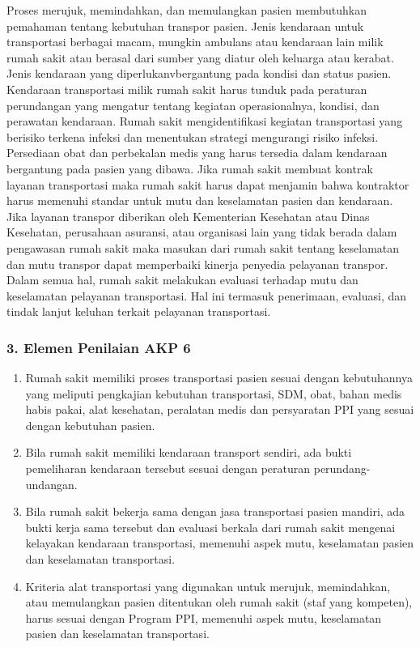 \documentclass[
]{book}
\providecommand{\tightlist}{%
  \setlength{\itemsep}{0pt}\setlength{\parskip}{0pt}}
\begin{document}
Proses merujuk, memindahkan, dan memulangkan pasien membutuhkan pemahaman tentang kebutuhan transpor pasien. Jenis kendaraan untuk transportasi berbagai macam, mungkin ambulans atau kendaraan lain milik rumah sakit atau berasal dari sumber yang diatur oleh keluarga atau kerabat. Jenis kendaraan yang diperlukanvbergantung pada kondisi dan status pasien. Kendaraan transportasi milik rumah sakit harus tunduk pada peraturan perundangan yang mengatur tentang kegiatan operasionalnya, kondisi, dan perawatan kendaraan. Rumah sakit mengidentifikasi kegiatan transportasi yang berisiko terkena infeksi dan menentukan strategi mengurangi risiko infeksi. Persediaan obat dan perbekalan medis yang harus tersedia dalam kendaraan bergantung pada pasien yang dibawa. Jika rumah sakit membuat kontrak layanan transportasi maka rumah sakit harus dapat menjamin bahwa kontraktor harus memenuhi standar untuk mutu dan keselamatan pasien dan kendaraan. Jika layanan transpor diberikan oleh Kementerian Kesehatan atau Dinas Kesehatan, perusahaan asuransi, atau
organisasi lain yang tidak berada dalam pengawasan rumah sakit maka masukan dari rumah sakit tentang keselamatan dan mutu transpor dapat memperbaiki kinerja penyedia pelayanan transpor. Dalam semua hal, rumah sakit melakukan evaluasi terhadap mutu dan keselamatan pelayanan transportasi. Hal ini termasuk penerimaan, evaluasi, dan tindak lanjut keluhan terkait pelayanan transportasi.

\hypertarget{elemen-penilaian-akp-6}{%
\subsubsection*{3. Elemen Penilaian AKP 6}\label{elemen-penilaian-akp-6}}

\begin{enumerate}
\def\labelenumi{\alph{enumi}.}
\tightlist
\item
  Rumah sakit memiliki proses transportasi pasien sesuai dengan kebutuhannya yang meliputi pengkajian kebutuhan transportasi, SDM, obat, bahan medis habis pakai, alat kesehatan, peralatan medis dan persyaratan PPI yang sesuai dengan kebutuhan pasien.
\item
  Bila rumah sakit memiliki kendaraan transport sendiri, ada bukti pemeliharan kendaraan tersebut sesuai dengan peraturan perundang-undangan.
\item
  Bila rumah sakit bekerja sama dengan jasa transportasi pasien mandiri, ada bukti kerja sama tersebut dan evaluasi berkala dari rumah sakit mengenai kelayakan kendaraan transportasi, memenuhi aspek mutu, keselamatan pasien dan keselamatan transportasi.
\item
  Kriteria alat transportasi yang digunakan untuk merujuk, memindahkan, atau memulangkan pasien ditentukan oleh rumah sakit (staf yang kompeten), harus sesuai dengan Program PPI, memenuhi aspek mutu, keselamatan pasien dan keselamatan transportasi.
\end{enumerate}
\end{document}
